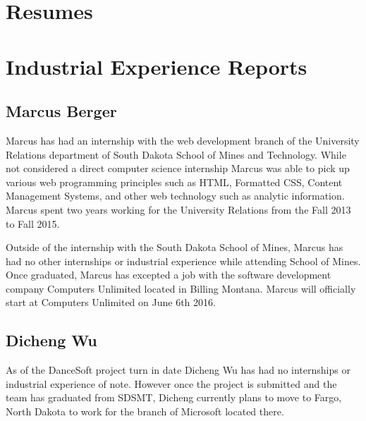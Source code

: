 


\section{Resumes}




\section{Industrial Experience Reports}

\subsection{Marcus Berger}

Marcus has had an internship with the web development branch of the University Relations department of South Dakota School of Mines and Technology. While not considered a direct computer science internship Marcus was able to pick up various web programming principles such as HTML, Formatted CSS, Content Management Systems, and other web technology such as analytic information. Marcus spent two years working for the University Relations from the Fall 2013 to Fall 2015. 

Outside of the internship with the South Dakota School of Mines, Marcus has had no other internships or industrial experience while attending School of Mines. Once graduated, Marcus has excepted a job with the software development company Computers Unlimited located in Billing Montana. Marcus will officially start at Computers Unlimited on June 6th 2016.  

\subsection{Dicheng Wu}

As of the DanceSoft project turn in date Dicheng Wu has had no internships or industrial experience of note. However once the project is submitted and the team has graduated from SDSMT, Dicheng currently plans to move to Fargo, North Dakota to work for the branch of Microsoft located there.  


